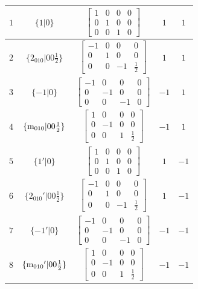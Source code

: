 \documentclass[fleqn,8pt]{jsarticle}
\begin{document}
\begin{longtable}{ccccc}
$ 1 $ & $ \{1|0\} $ & $ \begin{bmatrix} 1 & 0 & 0 & 0 \\ 0 & 1 & 0 & 0 \\ 0 & 0 & 1 & 0 \end{bmatrix} $ & $ 1 $ & $ 1 $ \\ \hline
$ 2 $ & $ \{2{}_{010}|0 0 \frac{1}{2}\} $ & $ \begin{bmatrix} -1 & 0 & 0 & 0 \\ 0 & 1 & 0 & 0 \\ 0 & 0 & -1 & \frac{1}{2} \end{bmatrix} $ & $ 1 $ & $ 1 $ \\ \hline
$ 3 $ & $ \{-1|0\} $ & $ \begin{bmatrix} -1 & 0 & 0 & 0 \\ 0 & -1 & 0 & 0 \\ 0 & 0 & -1 & 0 \end{bmatrix} $ & $ -1 $ & $ 1 $ \\ \hline
$ 4 $ & $ \{{\rm m}_{010}|0 0 \frac{1}{2}\} $ & $ \begin{bmatrix} 1 & 0 & 0 & 0 \\ 0 & -1 & 0 & 0 \\ 0 & 0 & 1 & \frac{1}{2} \end{bmatrix} $ & $ -1 $ & $ 1 $ \\ \hline
$ 5 $ & $ \{1{}'|0\} $ & $ \begin{bmatrix} 1 & 0 & 0 & 0 \\ 0 & 1 & 0 & 0 \\ 0 & 0 & 1 & 0 \end{bmatrix} $ & $ 1 $ & $ -1 $ \\ \hline
$ 6 $ & $ \{2{}_{010}{}'|0 0 \frac{1}{2}\} $ & $ \begin{bmatrix} -1 & 0 & 0 & 0 \\ 0 & 1 & 0 & 0 \\ 0 & 0 & -1 & \frac{1}{2} \end{bmatrix} $ & $ 1 $ & $ -1 $ \\ \hline
$ 7 $ & $ \{-1{}'|0\} $ & $ \begin{bmatrix} -1 & 0 & 0 & 0 \\ 0 & -1 & 0 & 0 \\ 0 & 0 & -1 & 0 \end{bmatrix} $ & $ -1 $ & $ -1 $ \\ \hline
$ 8 $ & $ \{{\rm m}_{010}{}'|0 0 \frac{1}{2}\} $ & $ \begin{bmatrix} 1 & 0 & 0 & 0 \\ 0 & -1 & 0 & 0 \\ 0 & 0 & 1 & \frac{1}{2} \end{bmatrix} $ & $ -1 $ & $ -1 $ \\
\end{longtable}
\end{document}
